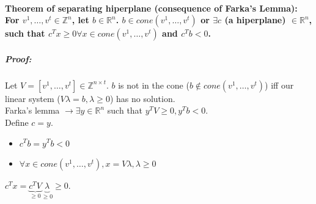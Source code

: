 \documentclass[main]{subfiles}
\begin{document}
\paragraph{Theorem of separating hiperplane (consequence of Farka's Lemma): For
$v^1, \dots, v^t \in \mathbb{Z}^n$, let $b \in \mathbb{R}^n$. $b \in cone(v^1,
\dots, v^t)$ or $\exists c$ (a hiperplane) $\in \mathbb{R}^n$, such that $c^T
x\geq 0 \forall x \in cone(v^1, \dots, v^t)$ and $c^T b < 0$.}

\subparagraph{Proof:}
Let $V = [v^1, \dots, v^t] \in \mathbb{Z}^{n \times t}$. $b$ is not in the cone
($b \notin cone(v^1, \dots, v^t)$) iff our linear system ($V \lambda = b,
\lambda \geq 0$) has no solution.\\

Farka's lemma $\rightarrow \exists y \in \mathbb{R}^n$ such that $y^T V \geq 0, 
y^T b < 0$.\\
Define $c = y$.
\begin{itemize}
\item $c^T b = y^T b < 0$
\item $\forall x \in cone(v^1, \dots, v^t), x = V \lambda, \lambda \geq 0$
\end{itemize}

$c^T x = \underbrace{c^T V}_{\geq 0} \underbrace{\lambda}_{\geq 0} \geq 0$.
\end{document}
